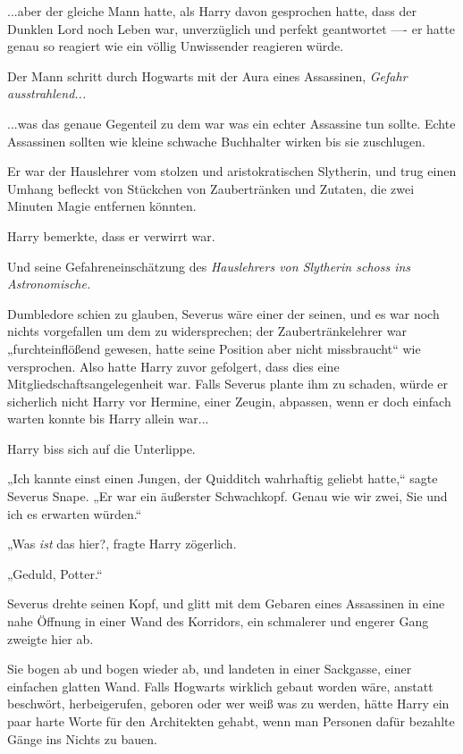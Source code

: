 {...aber der gleiche Mann hatte, als Harry davon gesprochen hatte, dass der Dunklen Lord noch Leben war, unverzüglich und perfekt geantwortet ---- er hatte genau so reagiert wie ein völlig Unwissender reagieren würde.

Der Mann schritt durch Hogwarts mit der Aura eines Assassinen, \emph{Gefahr ausstrahlend...}

...was das genaue Gegenteil zu dem war was ein echter Assassine tun sollte. Echte Assassinen sollten wie kleine schwache Buchhalter wirken bis sie zuschlugen.

Er war der Hauslehrer vom stolzen und aristokratischen Slytherin, und trug einen Umhang befleckt von Stückchen von Zaubertränken und Zutaten, die zwei Minuten Magie entfernen könnten.

Harry bemerkte, dass er verwirrt war.

Und seine Gefahreneinschätzung des \emph{Hauslehrer\emph{s von} \emph{Slytherin} schoss ins Astronomische.}

Dumbledore schien zu glauben, Severus wäre einer der seinen, und es war noch nichts vorgefallen um dem zu widersprechen; der Zaubertränkelehrer war „furchteinflößend gewesen, hatte seine Position aber nicht missbraucht“ wie versprochen. Also hatte Harry zuvor gefolgert, dass dies eine Mitgliedschaftsangelegenheit war. Falls Severus plante ihm zu schaden, würde er sicherlich nicht Harry vor Hermine, einer Zeugin, abpassen, wenn er doch einfach warten konnte bis Harry allein war...

Harry biss sich auf die Unterlippe.

„Ich kannte einst einen Jungen, der Quidditch wahrhaftig geliebt hatte,“ sagte Severus Snape. „Er war ein äußerster Schwachkopf. Genau wie wir zwei, Sie und ich es erwarten würden.“

„Was \emph{ist} das hier?, fragte Harry zögerlich.

„Geduld, Potter.“

Severus drehte seinen Kopf, und glitt mit dem Gebaren eines Assassinen in eine nahe Öffnung in einer Wand des Korridors, ein schmalerer und engerer Gang zweigte hier ab.

Sie bogen ab und bogen wieder ab, und landeten in einer Sackgasse, einer einfachen glatten Wand. Falls Hogwarts wirklich gebaut worden wäre, anstatt beschwört, herbeigerufen, geboren oder wer weiß was zu werden, hätte Harry ein paar harte Worte für den Architekten gehabt, wenn man Personen dafür bezahlte Gänge ins Nichts zu bauen.

}
